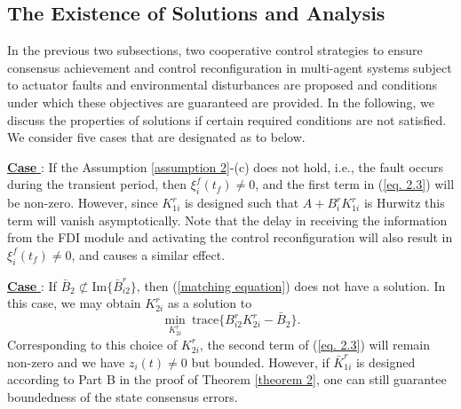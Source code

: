 \documentclass[12pt,draftcls,onecolumn]{IEEEtran}
\newcommand{\RNum}[1]{\uppercase\expandafter{\romannumeral #1\relax}}
\begin{document}
\subsection{The Existence of Solutions and  Analysis}\label{subsection 3}\par
In the previous two subsections, two cooperative control strategies to ensure consensus achievement and control reconfiguration in  multi-agent systems subject to actuator faults and environmental disturbances are proposed and conditions under which  these objectives are guaranteed are provided. In the following, we discuss the properties of solutions if certain required conditions are not satisfied. We consider five cases that are designated as \RNum{1} to \RNum{4} below. \par
\underline{\textbf{Case \RNum{1}}}: If the Assumption \ref{assumption 2}-(c) does not hold, i.e., the fault occurs during the transient period, then $\xi_i^f(t_f)\ne 0$, and  the first term in  (\ref{eq. 2.3}) will be non-zero. However, since $K_{1i}^r$ is designed such that $A+B_i^rK_{1i}^r$ is Hurwitz this term will  vanish asymptotically. Note that the delay in receiving the information from the FDI module and  activating the control reconfiguration  will also result in $\xi_i^f(t_f)\ne 0$, and causes a similar effect.  \par
\underline{\textbf{Case \RNum{2}}}: If  $\bar B_2\not\subset \text{Im}\{ \bar B_{i2}^r\}$, then   (\ref{matching equation}) does not have a solution. In this case, we may obtain $K_{2i}^{r}$ as a solution to
\begin{equation*}
\min_{K_{2i}^r} \ \text{trace}\{B_{i2}^rK_{2i}^r-\bar B_2\}.
\end{equation*}
Corresponding to this choice of $K_{2i}^r$, the second  term of   (\ref{eq. 2.3}) will remain non-zero and we have $z_i(t)\ne 0$ but bounded. However, if  $\bar K_{1i}^{r}$ is designed according to Part B in the proof of Theorem \ref{theorem 2},  one can still guarantee boundedness of the state consensus errors.
\end{document}
